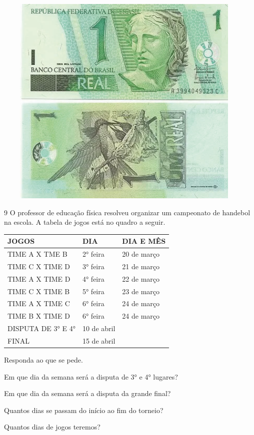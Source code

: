 \includegraphics[width=5.00000in,height=4.05208in]{media/image64.png}


\num{9} O professor de educação física resolveu organizar um campeonato de
handebol na escola. A tabela de jogos está no quadro a seguir.

\begin{longtable}[]{@{}lll@{}}
\toprule
JOGOS & DIA & DIA E MÊS\tabularnewline
\midrule
\endhead
TIME A X TME B & 2° feira & 20 de março\tabularnewline
TIME C X TIME D & 3° feira & 21 de março\tabularnewline
TIME A X TIME D & 4° feira & 22 de março\tabularnewline
TIME C X TIME B & 5° feira & 23 de março\tabularnewline
TIME A X TIME C & 6° feira & 24 de março\tabularnewline
TIME B X TIME D & 6° feira & 24 de março\tabularnewline
DISPUTA DE 3° E 4° & 10 de abril\tabularnewline
FINAL & 15 de abril\tabularnewline
\bottomrule
\end{longtable}

Responda ao que se pede.

\begin{escolha}
\item Em que dia da semana será a disputa de 3° e 4° lugares?


\item Em que dia da semana será a disputa da grande final?


\item Quantos dias se passam do início ao fim do torneio?


\item Quantos dias de jogos teremos?

\end{escolha}

